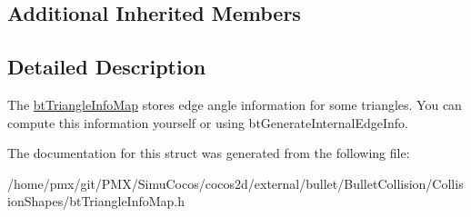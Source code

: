 \subsection*{Additional Inherited Members}


\subsection{Detailed Description}
The \hyperlink{structbtTriangleInfoMap}{bt\+Triangle\+Info\+Map} stores edge angle information for some triangles. You can compute this information yourself or using bt\+Generate\+Internal\+Edge\+Info. 

The documentation for this struct was generated from the following file\+:\begin{DoxyCompactItemize}
\item 
/home/pmx/git/\+P\+M\+X/\+Simu\+Cocos/cocos2d/external/bullet/\+Bullet\+Collision/\+Collision\+Shapes/bt\+Triangle\+Info\+Map.\+h\end{DoxyCompactItemize}
